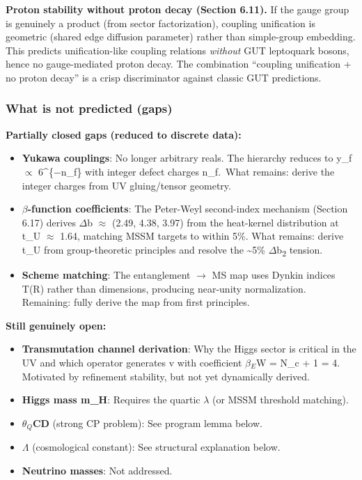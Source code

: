 \documentclass[11pt,a4paper]{article}
\theoremstyle{remark}
\providecommand{\tightlist}{%
  \setlength{\itemsep}{0pt}\setlength{\parskip}{0pt}}
\begin{document}
\textbf{Proton stability without proton decay (Section 6.11).} If the gauge group is genuinely a product (from sector factorization), coupling unification is geometric (shared edge diffusion parameter) rather than simple-group embedding. This predicts unification-like coupling relations \emph{without} GUT leptoquark bosons, hence no gauge-mediated proton decay. The combination ``coupling unification + no proton decay'' is a crisp discriminator against classic GUT predictions.

\subsubsection{What is not predicted (gaps)}\label{what-is-not-predicted-gaps}

\textbf{Partially closed gaps (reduced to discrete data):}

\begin{itemize}
\tightlist
\item
  \textbf{Yukawa couplings}: No longer arbitrary reals. The hierarchy reduces to
  y\_f \ensuremath{\propto} 6\^{}\{\ensuremath{-}n\_f\} with integer defect charges n\_f.~What remains: derive the
  integer charges from UV gluing/tensor geometry.
\item
  \textbf{\ensuremath{\beta}-function coefficients}: The Peter-Weyl second-index mechanism (Section 6.17)
  derives \ensuremath{\Delta}b \ensuremath{\approx} (2.49, 4.38, 3.97) from the heat-kernel distribution at t\_U \ensuremath{\approx} 1.64,
  matching MSSM targets to within 5\%. What remains: derive t\_U from group-theoretic
  principles and resolve the \textasciitilde5\% \ensuremath{\Delta}b\textsubscript{2} tension.
\item
  \textbf{Scheme matching}: The entanglement \ensuremath{\to} MS map uses Dynkin indices T(R) rather than dimensions, producing near-unity normalization. Remaining: fully derive the map from first principles.
\end{itemize}

\textbf{Still genuinely open:}

\begin{itemize}
\tightlist
\item
  \textbf{Transmutation channel derivation}: Why the Higgs sector is critical in
  the UV and which operator generates v with coefficient \(\beta{}_E\)W = N\_c + 1 = 4.
  Motivated by refinement stability, but not yet dynamically derived.
\item
  \textbf{Higgs mass m\_H}: Requires the quartic \ensuremath{\lambda} (or MSSM threshold matching).
\item
  \textbf{\(\theta{}_Q\)CD} (strong CP problem): See program lemma below.
\item
  \textbf{\ensuremath{\Lambda}} (cosmological constant): See structural explanation below.
\item
  \textbf{Neutrino masses}: Not addressed.
\end{itemize}
\end{document}
